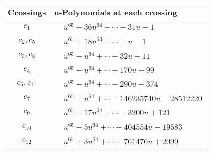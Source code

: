 \documentclass[1p]{elsarticle_modified}
\theoremstyle{definition}
\begin{document}
\begin{tabular}{m{50pt}|m{274pt}}
Crossings & \hspace{64pt}u-Polynomials at each crossing \\
\hline $$\begin{aligned}c_{1}\end{aligned}$$&$\begin{aligned}
&u^{65}+36 u^{64}+\cdots-31 u-1
\end{aligned}$\\
\hline $$\begin{aligned}c_{2},c_{5}\end{aligned}$$&$\begin{aligned}
&u^{65}+18 u^{63}+\cdots+u-1
\end{aligned}$\\
\hline $$\begin{aligned}c_{3},c_{8}\end{aligned}$$&$\begin{aligned}
&u^{65}- u^{64}+\cdots+32 u-11
\end{aligned}$\\
\hline $$\begin{aligned}c_{4}\end{aligned}$$&$\begin{aligned}
&u^{65}- u^{64}+\cdots+170 u-99
\end{aligned}$\\
\hline $$\begin{aligned}c_{6},c_{11}\end{aligned}$$&$\begin{aligned}
&u^{65}- u^{64}+\cdots-290 u-374
\end{aligned}$\\
\hline $$\begin{aligned}c_{7}\end{aligned}$$&$\begin{aligned}
&u^{65}+u^{64}+\cdots-146235740 u-28512220
\end{aligned}$\\
\hline $$\begin{aligned}c_{9}\end{aligned}$$&$\begin{aligned}
&u^{65}-17 u^{64}+\cdots-3200 u+121
\end{aligned}$\\
\hline $$\begin{aligned}c_{10}\end{aligned}$$&$\begin{aligned}
&u^{65}-5 u^{64}+\cdots+404554 u-19583
\end{aligned}$\\
\hline $$\begin{aligned}c_{12}\end{aligned}$$&$\begin{aligned}
&u^{65}+3 u^{64}+\cdots+761476 u+2099
\end{aligned}$\\
\hline
\end{tabular}\\~\\
\end{document}
